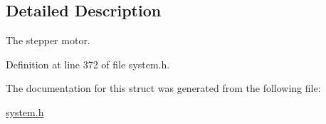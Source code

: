 \subsection{Detailed Description}
The stepper motor. 

Definition at line 372 of file system.h.

The documentation for this struct was generated from the following file:\begin{CompactItemize}
\item 
\hyperlink{system_8h}{system.h}\end{CompactItemize}
